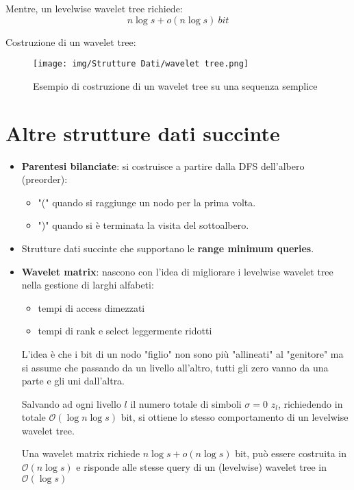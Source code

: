 Mentre, un levelwise wavelet tree richiede:
\begin{equation}
    n \log s + o(n \log s) \ bit
\end{equation}
\begin{esempio}
    Costruzione di un wavelet tree:
    \begin{figure}[!ht]
        \centering
        \texttt{[image: img/Strutture Dati/wavelet tree.png]}
        \caption{Esempio di costruzione di un wavelet tree su una sequenza semplice}
    \end{figure}
\end{esempio}
\section{Altre strutture dati succinte}
\begin{itemize}
    \item \textbf{Parentesi bilanciate}: si costruisce a partire dalla DFS dell'albero (preorder):
    \begin{itemize}
        \item "(" quando si raggiunge un nodo per la prima volta.
        \item ")" quando si è terminata la visita del sottoalbero.
    \end{itemize}
    \item Strutture dati succinte che supportano le \textbf{range minimum queries}.
    \item \textbf{Wavelet matrix}: nascono con l'idea di migliorare i levelwise wavelet tree nella gestione di larghi alfabeti:
    \begin{itemize}
        \item tempi di access dimezzati
        \item tempi di rank e select leggermente ridotti
    \end{itemize}
    
    L'idea è che i bit di un nodo "figlio" non sono più "allineati" al "genitore" ma si assume che passando da un livello all'altro, tutti gli zero vanno da una parte e gli uni dall'altra.
    
    Salvando ad ogni livello $l$ il numero totale di simboli $\sigma = 0$ $z_l$, richiedendo in totale $\mathcal{O}(\log n \log s)$ bit, si ottiene lo stesso comportamento di un levelwise wavelet tree.
    
    Una wavelet matrix richiede $n \log s + o(n \log s)$ bit, può essere costruita in $\mathcal{O}(n \log s)$ e risponde alle stesse query di un (levelwise) wavelet tree in $\mathcal{O}(\log s)$
\end{itemize}


